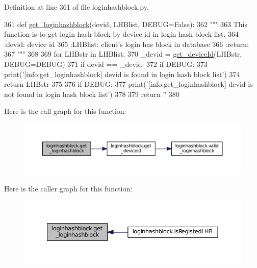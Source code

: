 Definition at line 361 of file loginhashblock.\+py.


\begin{DoxyCode}
361 \textcolor{keyword}{def }\hyperlink{namespaceloginhashblock_a6187961cb9009c7836e7e6e639085f93}{get\_loginhashblock}(devid, LHBlist, DEBUG=False):
362     \textcolor{stringliteral}{"""}
363 \textcolor{stringliteral}{    This function is to get login hash block by device id in login hash block list.}
364 \textcolor{stringliteral}{    :devid: device id}
365 \textcolor{stringliteral}{    :LHBlist: client's login has block in database}
366 \textcolor{stringliteral}{    :return:}
367 \textcolor{stringliteral}{    """}
368 
369     \textcolor{keywordflow}{for} LHBstr \textcolor{keywordflow}{in} LHBlist:
370         \_devid = \hyperlink{namespaceloginhashblock_a17417f2f6bca76ab51170082a562e5f6}{get\_deviceId}(LHBstr, DEBUG=DEBUG)
371         \textcolor{keywordflow}{if} devid == \_devid:
372             \textcolor{keywordflow}{if} DEBUG:
373                 print(\textcolor{stringliteral}{'[info:get\_loginhashblock] devid is found in login hash block list'})
374             \textcolor{keywordflow}{return} LHBstr
375 
376     \textcolor{keywordflow}{if} DEBUG:
377         print(\textcolor{stringliteral}{'[info:get\_loginhashblock] devid is not found in login hash block list'})
378 
379     \textcolor{keywordflow}{return} \textcolor{stringliteral}{''}
380 
\end{DoxyCode}


Here is the call graph for this function\+:
\nopagebreak
\begin{figure}[H]
\begin{center}
\leavevmode
\includegraphics[width=350pt]{namespaceloginhashblock_a6187961cb9009c7836e7e6e639085f93_cgraph}
\end{center}
\end{figure}




Here is the caller graph for this function\+:
\nopagebreak
\begin{figure}[H]
\begin{center}
\leavevmode
\includegraphics[width=350pt]{namespaceloginhashblock_a6187961cb9009c7836e7e6e639085f93_icgraph}
\end{center}
\end{figure}


